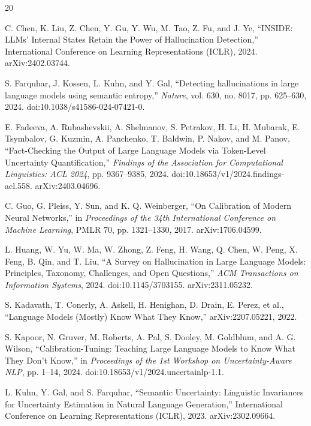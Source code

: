 \documentclass[11pt]{article}
\begin{document}
\begin{thebibliography}{20}

C. Chen, K. Liu, Z. Chen, Y. Gu, Y. Wu, M. Tao, Z. Fu, and J. Ye,
``INSIDE: LLMs' Internal States Retain the Power of Hallucination Detection,''
International Conference on Learning Representations (ICLR), 2024.
arXiv:2402.03744.

S. Farquhar, J. Kossen, L. Kuhn, and Y. Gal,
``Detecting hallucinations in large language models using semantic entropy,''
\textit{Nature}, vol. 630, no. 8017, pp. 625--630, 2024.
doi:10.1038/s41586-024-07421-0.

E. Fadeeva, A. Rubashevskii, A. Shelmanov, S. Petrakov, H. Li,
H. Mubarak, E. Tsymbalov, G. Kuzmin, A. Panchenko, T. Baldwin,
P. Nakov, and M. Panov,
``Fact-Checking the Output of Large Language Models via Token-Level Uncertainty Quantification,''
\textit{Findings of the Association for Computational Linguistics: ACL 2024},
pp. 9367--9385, 2024.
doi:10.18653/v1/2024.findings-acl.558.
arXiv:2403.04696.

C. Guo, G. Pleiss, Y. Sun, and K. Q. Weinberger,
``On Calibration of Modern Neural Networks,''
in \textit{Proceedings of the 34th International Conference on Machine Learning},
PMLR 70, pp. 1321--1330, 2017.
arXiv:1706.04599.

L. Huang, W. Yu, W. Ma, W. Zhong, Z. Feng, H. Wang, Q. Chen,
W. Peng, X. Feng, B. Qin, and T. Liu,
``A Survey on Hallucination in Large Language Models: Principles, Taxonomy,
Challenges, and Open Questions,''
\textit{ACM Transactions on Information Systems}, 2024.
doi:10.1145/3703155.
arXiv:2311.05232.

S. Kadavath, T. Conerly, A. Askell, H. Henighan, D. Drain, E. Perez, et al.,
``Language Models (Mostly) Know What They Know,''
arXiv:2207.05221, 2022.

S. Kapoor, N. Gruver, M. Roberts, A. Pal, S. Dooley, M. Goldblum,
and A. G. Wilson,
``Calibration-Tuning: Teaching Large Language Models to Know What They Don't Know,''
in \textit{Proceedings of the 1st Workshop on Uncertainty-Aware NLP},
pp. 1--14, 2024.
doi:10.18653/v1/2024.uncertainlp-1.1.

L. Kuhn, Y. Gal, and S. Farquhar,
``Semantic Uncertainty: Linguistic Invariances for Uncertainty Estimation
in Natural Language Generation,''
International Conference on Learning Representations (ICLR), 2023.
arXiv:2302.09664.


\end{thebibliography}
\end{document}
